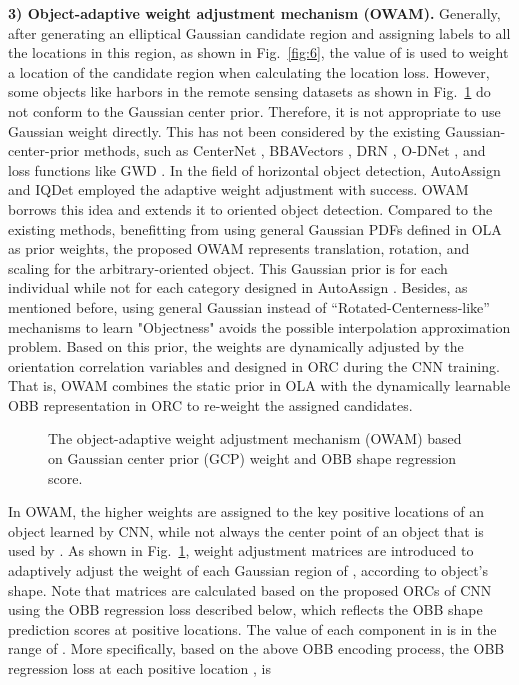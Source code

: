 \textbf{3) Object-adaptive weight adjustment mechanism (OWAM).} Generally, after generating an elliptical Gaussian candidate region and assigning labels to all the locations in this region, as shown in Fig.~\ref{fig:6}, the value of  is used to weight a location of the candidate region when calculating the location loss. However, some objects like harbors in the remote sensing datasets as shown in Fig.~\ref{fig:7} do not conform to the Gaussian center prior. Therefore, it is not appropriate to use Gaussian weight directly. This has not been considered by the existing Gaussian-center-prior methods, such as CenterNet \cite{zhou2019objects}, BBAVectors \cite{yi2020oriented}, DRN \cite{pan2020dynamic}, O-DNet \cite{wei2020oriented}, and loss functions like GWD \cite{yang2021rethinking}. In the field of horizontal object detection, AutoAssign \cite{zhu2020autoassign} and IQDet \cite{ma2021iqdet} employed the adaptive weight adjustment with success. OWAM borrows this idea and extends it to oriented object detection. Compared to the existing methods, benefitting from using general Gaussian PDFs defined in OLA as prior weights, the proposed OWAM represents translation, rotation, and scaling for the arbitrary-oriented object. This Gaussian prior is for each individual while not for each category designed in AutoAssign \cite{zhu2020autoassign}. Besides, as mentioned before, using general Gaussian instead of “Rotated-Centerness-like” mechanisms to learn "Objectness" avoids the possible interpolation approximation problem. Based on this prior, the weights are dynamically adjusted by the orientation correlation variables  and  designed in ORC during the CNN training. That is, OWAM combines the static prior in OLA with the dynamically learnable OBB representation in ORC to re-weight the assigned candidates.
\begin{figure}[bp]
	\vspace{-2em}
	\centering
	\vspace{-1em}
	\caption{The object-adaptive weight adjustment mechanism (OWAM) based on Gaussian center prior (GCP) weight and OBB shape regression score.}
	\label{fig:7}
	\vspace{-0.5em}
\end{figure} 

In OWAM, the higher weights are assigned to the key positive locations of an object learned by CNN, while not always the center point of an object that is used by . As shown in Fig.~\ref{fig:7}, weight adjustment matrices  are introduced to adaptively adjust the weight of each Gaussian region of , according to object’s shape. Note that matrices  are calculated based on the proposed ORCs of CNN using the OBB regression loss described below, which reflects the OBB shape prediction scores at positive locations. The value of each component in  is in the range of . More specifically, based on the above OBB encoding process, the OBB regression loss at each positive location , is

